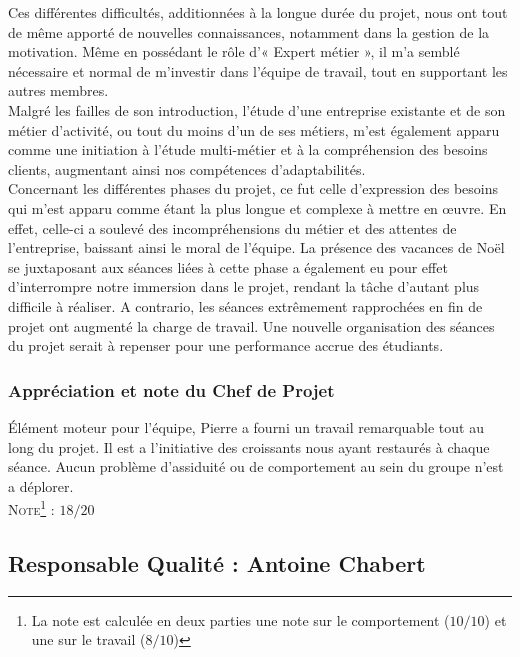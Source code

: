 Ces différentes difficultés, additionnées à la longue durée du projet, nous ont tout de même apporté de nouvelles connaissances, notamment dans la gestion de la motivation. Même en possédant le rôle d’« Expert métier », il m’a semblé nécessaire et normal de m’investir dans l’équipe de travail, tout en supportant les autres membres. \\
 
Malgré les failles de son introduction, l’étude d’une entreprise existante et de son métier d’activité, ou tout du moins d’un de ses métiers, m’est également apparu comme une initiation à l’étude multi-métier et à la compréhension des besoins clients, augmentant ainsi nos compétences d’adaptabilités. \\
 
Concernant les différentes phases du projet, ce fut celle d’expression des besoins qui m’est apparu comme étant la plus longue et complexe à mettre en œuvre. En effet, celle-ci a soulevé des incompréhensions du métier et des attentes de l’entreprise, baissant ainsi le moral de l’équipe. La présence des vacances de Noël se juxtaposant aux séances liées à cette phase a également eu pour effet d’interrompre notre immersion dans le projet, rendant la tâche d’autant plus difficile à réaliser. A contrario, les séances extrêmement rapprochées en fin de projet ont augmenté la charge de travail. Une nouvelle organisation des séances du projet serait à repenser pour une performance accrue des étudiants. \\

\subsubsection{Appréciation et note du Chef de Projet}

Élément moteur pour l’équipe, Pierre a fourni un travail remarquable tout au long du projet. Il est a l’initiative des croissants nous ayant restaurés à chaque séance.
Aucun problème d’assiduité ou de comportement au sein du groupe n’est a déplorer.\\

\noindent\textsc{Note\footnote{La note est calculée en deux parties une note sur le comportement ($10/10$) et une sur le travail ($8/10$)} :} $18/20$

\subsection{Responsable Qualité : Antoine Chabert}

